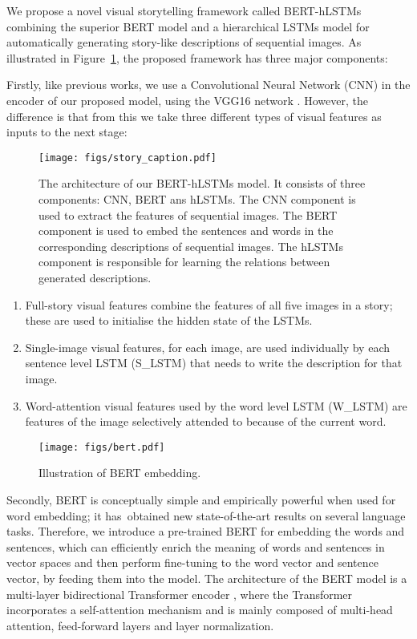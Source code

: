 \documentclass[a4paper,fleqn]{cas-sc}
\begin{document}
We propose a novel visual storytelling framework called BERT-hLSTMs combining the superior BERT model and a hierarchical LSTMs model for automatically generating  story-like descriptions of sequential images. 
As illustrated in Figure~\ref{FIG:story_caption}, the proposed framework has three major components:

Firstly, like previous works, we use a Convolutional Neural Network (CNN) in the encoder of our proposed model, using the VGG16 network \citep{Simonyan2014Very}. However, the difference is that from this we take three different types of visual features as inputs to the next stage:

\begin{figure}[pos=tb]
	\centering
		\texttt{[image: figs/story\_caption.pdf]}
	\caption{The architecture of our BERT-hLSTMs model. It consists of three components: CNN, BERT ans hLSTMs. The CNN component is used to extract the features of sequential images. The BERT component is used to embed the sentences and words in the corresponding descriptions of sequential images. The hLSTMs component is responsible for learning the relations between generated descriptions.}
	\label{FIG:story_caption}
\end{figure}

\begin{enumerate}
    \item Full-story visual features combine the features of all five images in a story; these are used to  initialise the hidden state of the LSTMs.
    \item Single-image visual features, for each image, are used individually by each sentence level LSTM (S\_LSTM) that needs to write the description for that image.
    \item Word-attention visual features used by the word level LSTM (W\_LSTM) are features of the image selectively attended to because of the current word.
\end{enumerate}


\begin{figure}[pos=t]
	\centering
		\texttt{[image: figs/bert.pdf]}
	\caption{Illustration of BERT embedding. }
	\label{FIG:bert}
\end{figure}


Secondly, BERT is conceptually simple and empirically powerful when used for word embedding; it has obtained new state-of-the-art results on several language tasks. Therefore, we introduce a pre-trained BERT \citep{BERT2018} for embedding the words and sentences, which can efficiently enrich the meaning of words and sentences in vector spaces and then perform fine-tuning to the word vector and sentence vector, by feeding them into the model. The architecture of the BERT model is a multi-layer bidirectional Transformer encoder \citep{transformer2017}, where the Transformer incorporates a self-attention mechanism and is mainly composed of multi-head attention, feed-forward layers and layer normalization. 
 
\end{document}
